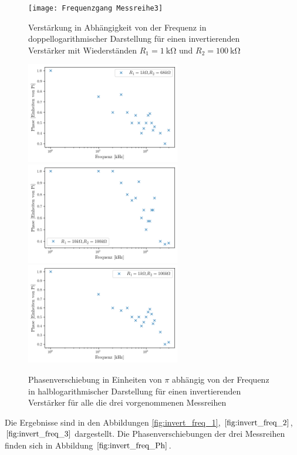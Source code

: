 \begin{figure}
\centering
\texttt{[image: Frequenzgang Messreihe3]}
\caption{Verstärkung in Abhängigkeit von der Frequenz in doppellogarithmischer Darstellung für einen invertierenden Verstärker mit Wiederständen $R_1=\SI{1}{\kilo\ohm}$ und $R_2=\SI{100}{\kilo\ohm}$}
\label{fig:invert_freq_3}
\end{figure}

\begin{figure}
\centering
\includegraphics[width=0.6\textwidth]{Operationsverstärker Phase1}
\includegraphics[width=0.6\textwidth]{Operationsverstärker Phase2}
\includegraphics[width=0.6\textwidth]{Operationsverstärker Phase3}
\caption{Phasenverschiebung in Einheiten von $\pi$ abhängig von der Frequenz in halblogarithmischer Darstellung für einen invertierenden Verstärker für alle die drei vorgenommenen Messreihen}
\label{fig:invert_freq_Ph}
\end{figure}
Die Ergebnisse sind in den Abbildungen \ref{fig:invert_freq_1}, $\ref{fig:invert_freq_2}$, $\ref{fig:invert_freq_3}$ dargestellt. Die Phasenverschiebungen der drei Messreihen finden sich in Abbildung $\ref{fig:invert_freq_Ph}$.
